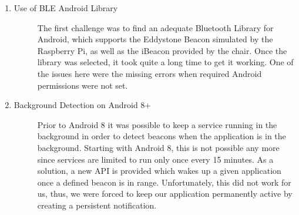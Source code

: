 \documentclass[
10pt, %
a4paper, %
oneside, %
headinclude,footinclude, %
BCOR5mm, %
]{scrartcl}
\begin{document}
\begin{enumerate}
\item 
	\begin{description}
	\item[Use of BLE Android Library] The first challenge was to find an adequate Bluetooth Library for Android, which supports the Eddystone Beacon simulated by the Raspberry Pi, as well as the iBeacon provided by the chair. Once the library was selected, it took quite a long time to get it working. One of the issues here were the missing errors when required Android permissions were not set. 
	\end{description}
	\item 
	\begin{description}
	\item[Background Detection on Android 8+] Prior to Android 8 it was possible to keep a service running in the background in order to detect beacons when the application is in the background. Starting with Android 8, this is not possible any more \cite{young_2017} since services are limited to run only once every 15 minutes. As a solution, a new API is provided which wakes up a given application once a defined beacon is in range. Unfortunately, this did not work for us, thus, we were forced to keep our application permanently active by creating a persistent notification.
	\end{description}
\end{enumerate}
\end{document}
